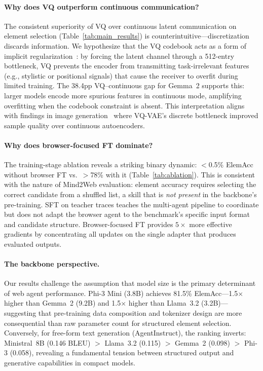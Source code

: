 \documentclass{article}
\begin{document}
\paragraph{Why does VQ outperform continuous communication?}
The consistent superiority of VQ over continuous latent communication on element selection (Table~\ref{tab:main_results}) is counterintuitive---discretization discards information.
We hypothesize that the VQ codebook acts as a form of implicit regularization~\cite{oord2017vqvae}: by forcing the latent channel through a 512-entry bottleneck, VQ prevents the encoder from transmitting task-irrelevant features (e.g., stylistic or positional signals) that cause the receiver to overfit during limited training.
The 38.4pp VQ--continuous gap for Gemma~2 supports this: larger models encode more spurious features in continuous mode, amplifying overfitting when the codebook constraint is absent.
This interpretation aligns with findings in image generation~\cite{razavi2019generating} where VQ-VAE's discrete bottleneck improved sample quality over continuous autoencoders.

\paragraph{Why does browser-focused FT dominate?}
The training-stage ablation reveals a striking binary dynamic: $<$0.5\% ElemAcc without browser FT vs.\ $>$78\% with it (Table~\ref{tab:ablation}).
This is consistent with the nature of Mind2Web evaluation: element accuracy requires selecting the correct candidate from a shuffled list, a skill that is \emph{not present} in the backbone's pre-training.
SFT on teacher traces teaches the multi-agent pipeline to coordinate but does not adapt the browser agent to the benchmark's specific input format and candidate structure.
Browser-focused FT provides $5\times$ more effective gradients by concentrating all updates on the single adapter that produces evaluated outputs.

\paragraph{The backbone perspective.}
Our results challenge the assumption that model size is the primary determinant of web agent performance.
Phi-3 Mini (3.8B) achieves 81.5\% ElemAcc---1.5$\times$ higher than Gemma~2 (9.2B) and 1.5$\times$ higher than Llama~3.2 (3.2B)---suggesting that pre-training data composition and tokenizer design are more consequential than raw parameter count for structured element selection.
Conversely, for free-form text generation (AgentInstruct), the ranking inverts: Ministral~8B (0.146 BLEU) $>$ Llama~3.2 (0.115) $>$ Gemma~2 (0.098) $>$ Phi-3 (0.058), revealing a fundamental tension between structured output and generative capabilities in compact models.
\end{document}
